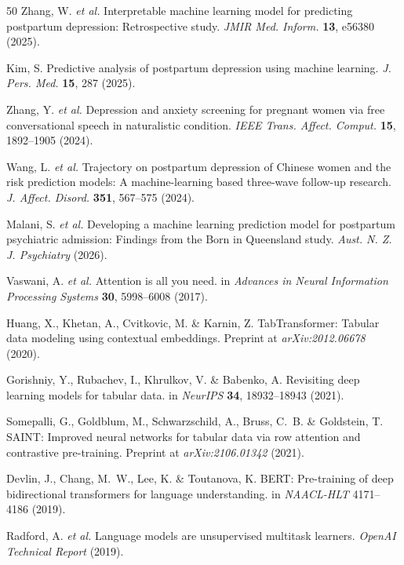 \documentclass[12pt,a4paper]{article}
\begin{document}
\begin{thebibliography}{50}
 Zhang, W. \textit{et al.} Interpretable machine learning model for predicting postpartum depression: Retrospective study. \textit{JMIR Med. Inform.} \textbf{13}, e56380 (2025).

 Kim, S. Predictive analysis of postpartum depression using machine learning. \textit{J. Pers. Med.} \textbf{15}, 287 (2025).

 Zhang, Y. \textit{et al.} Depression and anxiety screening for pregnant women via free conversational speech in naturalistic condition. \textit{IEEE Trans. Affect. Comput.} \textbf{15}, 1892--1905 (2024).

 Wang, L. \textit{et al.} Trajectory on postpartum depression of Chinese women and the risk prediction models: A machine-learning based three-wave follow-up research. \textit{J. Affect. Disord.} \textbf{351}, 567--575 (2024).

 Malani, S. \textit{et al.} Developing a machine learning prediction model for postpartum psychiatric admission: Findings from the Born in Queensland study. \textit{Aust. N. Z. J. Psychiatry} (2026).

 Vaswani, A. \textit{et al.} Attention is all you need. in \textit{Advances in Neural Information Processing Systems} \textbf{30}, 5998--6008 (2017).

 Huang, X., Khetan, A., Cvitkovic, M. \& Karnin, Z. TabTransformer: Tabular data modeling using contextual embeddings. Preprint at \textit{arXiv:2012.06678} (2020).

 Gorishniy, Y., Rubachev, I., Khrulkov, V. \& Babenko, A. Revisiting deep learning models for tabular data. in \textit{NeurIPS} \textbf{34}, 18932--18943 (2021).

 Somepalli, G., Goldblum, M., Schwarzschild, A., Bruss, C.~B. \& Goldstein, T. SAINT: Improved neural networks for tabular data via row attention and contrastive pre-training. Preprint at \textit{arXiv:2106.01342} (2021).

 Devlin, J., Chang, M.~W., Lee, K. \& Toutanova, K. BERT: Pre-training of deep bidirectional transformers for language understanding. in \textit{NAACL-HLT} 4171--4186 (2019).

 Radford, A. \textit{et al.} Language models are unsupervised multitask learners. \textit{OpenAI Technical Report} (2019).


\end{thebibliography}
\end{document}
